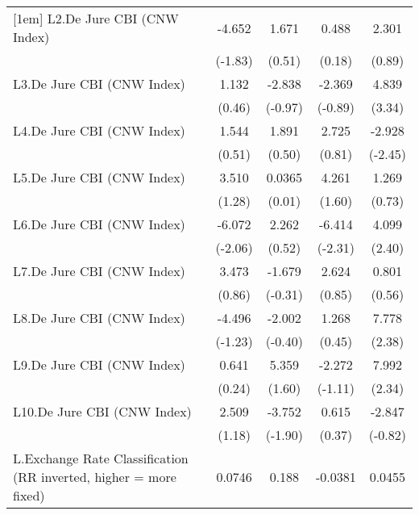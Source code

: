 {\begin{longtable}{l*{4}{c}}
[1em]
L2.De Jure CBI (CNW Index)&   -4.652         &    1.671         &    0.488         &    2.301         \\
                &  (-1.83)         &   (0.51)         &   (0.18)         &   (0.89)         \\
[1em]
L3.De Jure CBI (CNW Index)&    1.132         &   -2.838         &   -2.369         &    4.839\sym{***}\\
                &   (0.46)         &  (-0.97)         &  (-0.89)         &   (3.34)         \\
[1em]
L4.De Jure CBI (CNW Index)&    1.544         &    1.891         &    2.725         &   -2.928\sym{*}  \\
                &   (0.51)         &   (0.50)         &   (0.81)         &  (-2.45)         \\
[1em]
L5.De Jure CBI (CNW Index)&    3.510         &   0.0365         &    4.261         &    1.269         \\
                &   (1.28)         &   (0.01)         &   (1.60)         &   (0.73)         \\
[1em]
L6.De Jure CBI (CNW Index)&   -6.072\sym{*}  &    2.262         &   -6.414\sym{*}  &    4.099\sym{*}  \\
                &  (-2.06)         &   (0.52)         &  (-2.31)         &   (2.40)         \\
[1em]
L7.De Jure CBI (CNW Index)&    3.473         &   -1.679         &    2.624         &    0.801         \\
                &   (0.86)         &  (-0.31)         &   (0.85)         &   (0.56)         \\
[1em]
L8.De Jure CBI (CNW Index)&   -4.496         &   -2.002         &    1.268         &    7.778\sym{*}  \\
                &  (-1.23)         &  (-0.40)         &   (0.45)         &   (2.38)         \\
[1em]
L9.De Jure CBI (CNW Index)&    0.641         &    5.359         &   -2.272         &    7.992\sym{*}  \\
                &   (0.24)         &   (1.60)         &  (-1.11)         &   (2.34)         \\
[1em]
L10.De Jure CBI (CNW Index)&    2.509         &   -3.752         &    0.615         &   -2.847         \\
                &   (1.18)         &  (-1.90)         &   (0.37)         &  (-0.82)         \\
[1em]
L.Exchange Rate Classification (RR inverted, higher = more fixed)&   0.0746         &    0.188         &  -0.0381         &   0.0455         \\

\end{longtable}}

